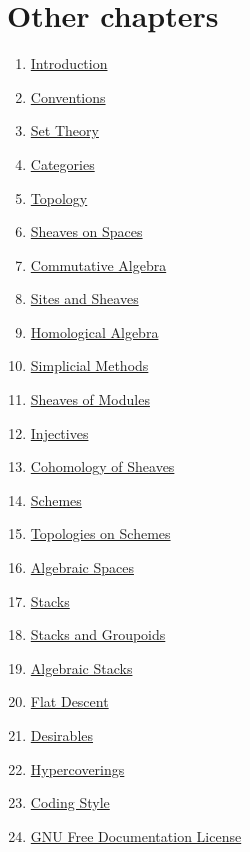 \section{Other chapters}

\begin{multicols}{2}
\begin{enumerate}
\item \hyperref[introduction-section-overview]{Introduction}
\item \hyperref[conventions-section-comments]{Conventions}
\item \hyperref[sets-section-introduction]{Set Theory}
\item \hyperref[categories-section-introduction]{Categories}
\item \hyperref[topology-section-introduction]{Topology}
\item \hyperref[sheaves-section-introduction]{Sheaves on Spaces}
\item \hyperref[algebra-section-introduction]{Commutative Algebra}
\item \hyperref[sites-section-introduction]{Sites and Sheaves}
\item \hyperref[homology-section-introduction]{Homological Algebra}
\item \hyperref[simplicial-section-introduction]{Simplicial Methods}
\item \hyperref[modules-section-introduction]{Sheaves of Modules}
\item \hyperref[injectives-section-introduction]{Injectives}
\item \hyperref[cohomology-section-introduction]{Cohomology of Sheaves}
\item \hyperref[schemes-section-introduction]{Schemes}
\item \hyperref[etale-section-introduction]{Topologies on Schemes}
\item \hyperref[spaces-section-introduction]{Algebraic Spaces}
\item \hyperref[stacks-section-introduction]{Stacks}
\item \hyperref[stacks-groupoids-section-introduction]{Stacks and Groupoids}
\item \hyperref[algebraic-section-introduction]{Algebraic Stacks}
\item \hyperref[flat-section-introduction]{Flat Descent}
\item \hyperref[desirables-section-introduction]{Desirables}
\item \hyperref[hypercovering-section-introduction]{Hypercoverings}
\item \hyperref[coding-section-style]{Coding Style}
\item \hyperref[fdl-version]{GNU Free Documentation License}
\end{enumerate}
\end{multicols}
